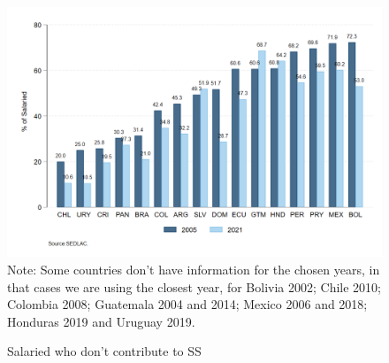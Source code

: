 \documentclass[english]{article}
\begin{document}
\begin{figure}[!htb]
    \centering
     \caption{Salaried who don’t contribute to SS}     
     \includegraphics[scale=.3]{latex/figures/Snapshot/snapshot_informal_ss_dep.png}
    \label{fig:SalariedSS}
    \footnotesize{Note: Some countries don’t have information for the chosen years, in that cases we are using the closest year, for Bolivia 2002; Chile 2010; Colombia 2008; Guatemala 2004 and 2014; Mexico 2006 and 2018; Honduras 2019 and Uruguay 2019.}
\end{figure}
\end{document}
